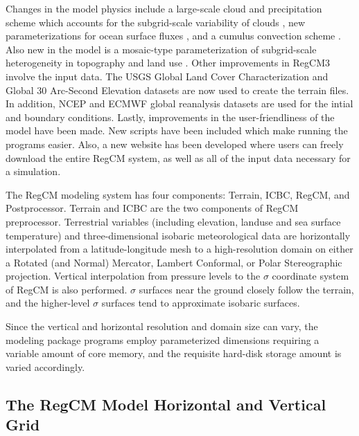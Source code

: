 Changes in the model physics include a large-scale cloud and precipitation scheme which accounts for the subgrid-scale variability of clouds \citep{Pal_00}, new parameterizations for ocean surface fluxes \citep{Zeng_98}, and a cumulus convection scheme \citep{Emanuel_91,Emanuel_99}. Also new in the model is a mosaic-type parameterization of subgrid-scale heterogeneity in topography and land use \citep{Giorgi_03}. Other improvements in \ac{RegCM}3 involve the input data.  The USGS Global Land Cover Characterization and Global 30 Arc-Second Elevation datasets are now used to create the terrain files.  In addition, NCEP and ECMWF global reanalysis datasets are used for the intial and boundary conditions. Lastly, improvements in the user-friendliness of the model have been made.  New scripts have been included which make running the programs easier.  Also, a new website has been developed where users can freely download the entire \ac{RegCM} system, as well as all of the input data necessary for a simulation.  

The \ac{RegCM} modeling system has four components: Terrain, ICBC, \ac{RegCM}, and Postprocessor.  Terrain and ICBC are the two components of \ac{RegCM} preprocessor. Terrestrial variables (including elevation, landuse and sea surface temperature) and three-dimensional isobaric meteorological data are horizontally interpolated from a latitude-longitude mesh to a high-resolution domain on either a Rotated (and Normal) Mercator, Lambert Conformal, or Polar Stereographic projection. Vertical interpolation from pressure levels to the $\sigma$ coordinate system of \ac{RegCM} is also performed. $\sigma$ surfaces near the ground closely follow the terrain, and the higher-level $\sigma$ surfaces tend to approximate isobaric surfaces. 

Since the vertical and horizontal resolution and domain size can vary, the modeling package programs employ parameterized dimensions requiring a variable amount of core memory, and the requisite hard-disk storage amount is varied accordingly.

\subsection{The \ac{RegCM} Model Horizontal and Vertical Grid}

